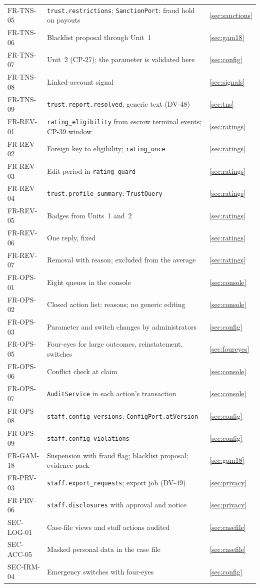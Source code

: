 \documentclass[11pt,a4paper]{article}
\begin{document}
{\begin{longtable}{@{}>{\ttfamily}p{2.4cm}>{\raggedright\arraybackslash}p{10.6cm}>{\raggedright\arraybackslash}p{2.2cm}@{}}
FR-TNS-05 & \texttt{trust.restrictions}; \texttt{SanctionPort}; fraud hold on payouts & \ref{sec:sanctions} \\
FR-TNS-06 & Blacklist proposal through Unit~1 & \ref{sec:gam18} \\
FR-TNS-07 & Unit~2 (CP-27); the parameter is validated here & \ref{sec:config} \\
FR-TNS-08 & Linked-account signal & \ref{sec:signals} \\
FR-TNS-09 & \texttt{trust.report.resolved}; generic text (DV-48) & \ref{sec:tns} \\
FR-REV-01 & \texttt{rating\_eligibility} from escrow terminal events; CP-39 window & \ref{sec:ratings} \\
FR-REV-02 & Foreign key to eligibility; \texttt{rating\_once} & \ref{sec:ratings} \\
FR-REV-03 & Edit period in \texttt{rating\_guard} & \ref{sec:ratings} \\
FR-REV-04 & \texttt{trust.profile\_summary}; \texttt{TrustQuery} & \ref{sec:ratings} \\
FR-REV-05 & Badges from Units~1 and~2 & \ref{sec:ratings} \\
FR-REV-06 & One reply, fixed & \ref{sec:ratings} \\
FR-REV-07 & Removal with reason; excluded from the average & \ref{sec:ratings} \\
FR-OPS-01 & Eight queues in the console & \ref{sec:console} \\
FR-OPS-02 & Closed action list; reasons; no generic editing & \ref{sec:console} \\
FR-OPS-03 & Parameter and switch changes by administrators & \ref{sec:config} \\
FR-OPS-05 & Four-eyes for large outcomes, reinstatement, switches & \ref{sec:foureyes} \\
FR-OPS-06 & Conflict check at claim & \ref{sec:console} \\
FR-OPS-07 & \texttt{AuditService} in each action's transaction & \ref{sec:console} \\
FR-OPS-08 & \texttt{staff.config\_versions}; \texttt{ConfigPort.atVersion} & \ref{sec:config} \\
FR-OPS-09 & \texttt{staff.config\_violations} & \ref{sec:config} \\
FR-GAM-18 & Suspension with fraud flag; blacklist proposal; evidence pack & \ref{sec:gam18} \\
FR-PRV-03 & \texttt{staff.export\_requests}; export job (DV-49) & \ref{sec:privacy} \\
FR-PRV-06 & \texttt{staff.disclosures} with approval and notice & \ref{sec:privacy} \\
SEC-LOG-01 & Case-file views and staff actions audited & \ref{sec:casefile} \\
SEC-ACC-05 & Masked personal data in the case file & \ref{sec:casefile} \\
SEC-IRM-04 & Emergency switches with four-eyes & \ref{sec:config} \\
\bottomrule
\end{longtable}}
\end{document}
